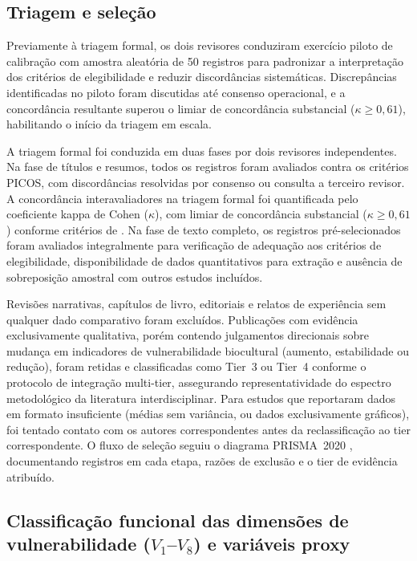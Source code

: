 \subsection{Triagem e seleção}
\label{sec:screening_cap2}

Previamente à triagem formal, os dois revisores conduziram exercício piloto de calibração com amostra aleatória de 50 registros para padronizar a interpretação dos critérios de elegibilidade e reduzir discordâncias sistemáticas. Discrepâncias identificadas no piloto foram discutidas até consenso operacional, e a concordância resultante superou o limiar de concordância substancial ($\kappa \geq 0{,}61$), habilitando o início da triagem em escala.

A triagem formal foi conduzida em duas fases por dois revisores independentes. Na fase de títulos e resumos, todos os registros foram avaliados contra os critérios PICOS, com discordâncias resolvidas por consenso ou consulta a terceiro revisor. A concordância interavaliadores na triagem formal foi quantificada pelo coeficiente kappa de Cohen ($\kappa$), com limiar de concordância substancial ($\kappa \geq 0{,}61$) conforme critérios de . Na fase de texto completo, os registros pré-selecionados foram avaliados integralmente para verificação de adequação aos critérios de elegibilidade, disponibilidade de dados quantitativos para extração e ausência de sobreposição amostral com outros estudos incluídos.

Revisões narrativas, capítulos de livro, editoriais e relatos de experiência sem qualquer dado comparativo foram excluídos. Publicações com evidência exclusivamente qualitativa, porém contendo julgamentos direcionais sobre mudança em indicadores de vulnerabilidade biocultural (aumento, estabilidade ou redução), foram retidas e classificadas como Tier~3 ou Tier~4 conforme o protocolo de integração multi-tier, assegurando representatividade do espectro metodológico da literatura interdisciplinar. Para estudos que reportaram dados em formato insuficiente (médias sem variância, ou dados exclusivamente gráficos), foi tentado contato com os autores correspondentes antes da reclassificação ao tier correspondente. O fluxo de seleção seguiu o diagrama PRISMA~2020 \cite{Page2021}, documentando registros em cada etapa, razões de exclusão e o tier de evidência atribuído.

\subsection{Classificação funcional das dimensões de vulnerabilidade ($V_1$--$V_8$) e variáveis proxy}
\label{sec:dimensions_cap2}

